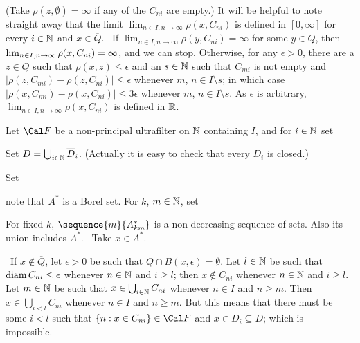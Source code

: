 {

\noindent (Take $\rho(z,\emptyset)=\infty$ if any of the $C_{ni}$ are
empty.)   It will be helpful to note straight away that the limit
$\lim_{n\in I,n\to\infty}\rho(x,C_{ni})$ is defined in $[0,\infty]$ for
every $i\in\Bbb N$ and $x\in\overline{Q}$.   \Prf\ If
$\lim_{n\in I,n\to\infty}\rho(y,C_{ni})=\infty$ for some $y\in Q$, then
$\lim_{n\in I,n\to\infty}\rho(x,C_{ni})\penalty-100=\infty$,
and we can stop.
Otherwise, for any $\epsilon>0$, there are a $z\in Q$ such that
$\rho(x,z)\le\epsilon$ and an $s\in\Bbb N$ such that $C_{mi}$ is not
empty and $|\rho(z,C_{mi})-\rho(z,C_{ni})|\le\epsilon$ whenever $m$,
$n\in I\setminus s$;  in which case
$|\rho(x,C_{mi})-\rho(x,C_{ni})|\le 3\epsilon$ whenever $m$,
$n\in I\setminus s$.   As $\epsilon$ is arbitrary,
$\lim_{n\in I,n\to\infty}\rho(x,C_{ni})$ is defined in $\Bbb R$.\ \Qed

Let $\Cal F$ be a non-principal ultrafilter on $\Bbb N$ containing $I$,
and for $i\in\Bbb N$ set


\noindent Set $D=\bigcup_{i\in\Bbb N}\overline{D}_i$.   (Actually it is
easy to check that every $D_i$ is closed.)

\medskip

 Set


\noindent note that $A^*$ is a Borel set.   For $k$, $m\in\Bbb N$, set


\noindent For fixed $k$, $\sequence{m}{A^*_{km}}$ is a non-decreasing
sequence of sets.   Also its union includes $A^*$.   \Prf\ Take
$x\in A^*$.

\medskip

\qquad\grheada\Quer\ If $x\notin\overline{Q}$, let $\epsilon>0$ be such
that $Q\cap B(x,\epsilon)=\emptyset$.   Let $l\in\Bbb N$ be such that
$\mathop{\text{diam}} C_{ni}\le\epsilon$ whenever $n\in\Bbb N$ and $i\ge l$;   then
$x\notin C_{ni}$ whenever $n\in\Bbb N$ and $i\ge l$.   Let $m\in\Bbb N$
be such that $x\in\bigcup_{i\in\Bbb N}C_{ni}$ whenever $n\in I$ and
$n\ge m$.   Then $x\in\bigcup_{i<l}C_{ni}$ whenever $n\in I$ and
$n\ge m$.   But this means that there must be some $i<l$ such that
$\{n:x\in C_{ni}\}\in\Cal F$ and $x\in D_i\subseteq D$;  which is
impossible.\ \Bang

}
